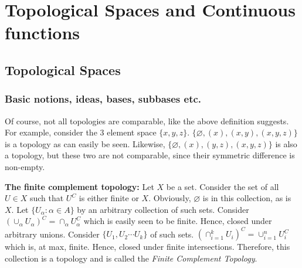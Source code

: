 \documentclass[main.tex]{subfiles}
\begin{document}
\chapter{Topological Spaces and Continuous functions}
\section{Topological Spaces}
\subsection{Basic notions, ideas, bases, subbases etc.}
\begin{remark}
    Of course, not all topologies are comparable, like the above definition suggests. For example, consider the 3 element space $\{x,y,z\}$. $\{\varnothing,(x),(x,y),(x,y,z)\}$ is a topology as can easily be seen. Likewise, $\{\varnothing,(x),(y,z),(x,y,z)\}$ is also a topology, but these two are not comparable, since their symmetric difference is non-empty.
\end{remark}
\begin{example}
    \textbf{The finite complement topology:} Let $X$ be a set. Consider the set of all $U \in X$ such that $U^C$ is either finite or $X$. Obviously, $\varnothing$ is in this collection, as is $X$. Let $\{U_{\alpha}:\alpha \in A\}$ by an arbitrary collection of such sets. Consider $(\cup_{\alpha} U_{\alpha})^C=\cap_{\alpha} U^{C}_{\alpha}$ which is easily seen to be finite. Hence, closed under arbitrary unions.
    Consider $\{U_1,U_2 \cdots U_k\}$ of such sets. $(\cap_{i=1}^{k}U_{i})^C=\cup_{i=1}^{n} U^{C}_i$ which is, at max, finite. Hence, closed under finite intersections. Therefore, this collection is a topology and is called the \emph{Finite Complement Topology}.
\end{example}
\end{document}
